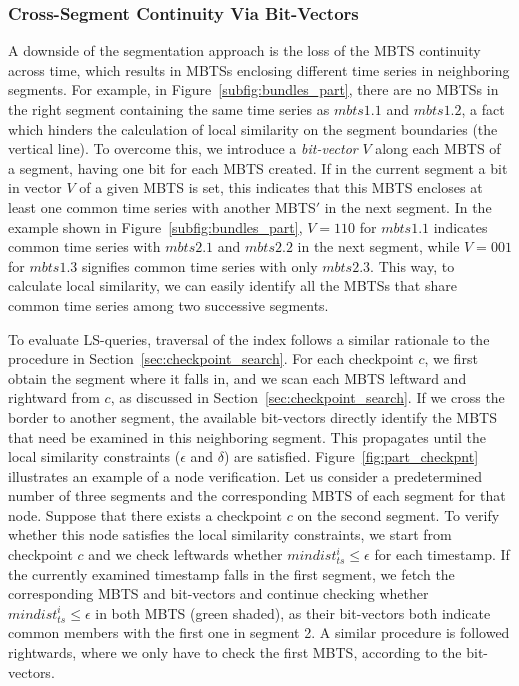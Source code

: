 \subsubsection{Cross-Segment Continuity Via Bit-Vectors}
\label{subsec:bit_vectors}
A downside of the segmentation approach is the loss of the MBTS continuity across time, which results in MBTSs enclosing different time series in neighboring segments. For example, in Figure~\ref{subfig:bundles_part}, there are no MBTSs in the right segment containing the same time series as $mbts1.1$ and $mbts1.2$, a fact which hinders the calculation of local similarity on the segment boundaries (the vertical line). To overcome this, we introduce a \textit{bit-vector} $V$ along each MBTS of a segment, having one bit for each MBTS created. If in the current segment a bit in vector $V$ of a given MBTS is set, this indicates that this MBTS encloses at least one common time series with another MBTS$'$ in the next segment. In the example shown in Figure~\ref{subfig:bundles_part}, $V=110$ for $mbts1.1$ indicates common time series with $mbts2.1$ and $mbts2.2$ in the next segment, while $V=001 $ for $mbts1.3$ signifies common time series with only $mbts2.3$. This way, to calculate local similarity, we can easily identify all the MBTSs that share common time series among two successive segments. 

To evaluate LS-queries, traversal of the \sbtsr index follows a similar rationale to the procedure in Section~\ref{sec:checkpoint_search}. For each checkpoint $c$, we first obtain the segment where it falls in, and we scan each MBTS leftward and rightward from $c$, as discussed in Section~\ref{sec:checkpoint_search}. If we cross the border to another segment, the available bit-vectors directly identify the MBTS that need be examined in this neighboring segment. This propagates until the local similarity constraints ($\epsilon$ and $\delta$) are satisfied. Figure~\ref{fig:part_checkpnt} illustrates an example of a node verification. Let us consider a predetermined number of three segments and the corresponding MBTS of each segment for that node. Suppose that there exists a checkpoint $c$ on the second segment. To verify whether this node satisfies the local similarity constraints, we start from checkpoint $c$ and we check leftwards whether $mindist_{ts}^{i} \leq \epsilon$ for each timestamp. If the currently examined timestamp falls in the first segment, we fetch the corresponding MBTS and bit-vectors and continue checking whether $mindist_{ts}^{i} \leq \epsilon$ in both MBTS (green shaded), as their bit-vectors both indicate common members with the first one in segment 2. A similar procedure is followed rightwards, where we only have to check the first MBTS, according to the bit-vectors.

